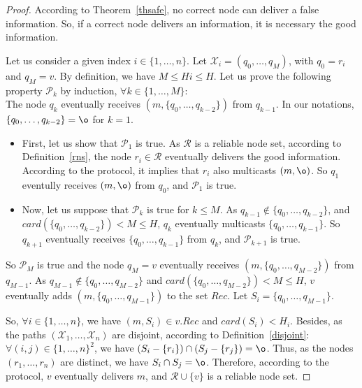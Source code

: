 \documentclass[a4paper,11pt]{article}
\begin{document}
\begin{proof}
According to Theorem~\ref{thsafe}, no correct node can deliver a false information. So, if a correct node delivers an information, it is necessary the good information.

Let us consider a given index $i \in \{1,\dots,n\}$.
Let $\mathcal{X}_i = (q_0,\dots,q_M)$, with $q_0 = r_i$ and $q_M = v$. By definition, we have $M \leq Hi \leq H$.
Let us prove the following property $\mathcal{P}_k$ by induction, $\forall k \in \{1,\dots,M\}$:
\\The node $q_k$ eventually receives $(m,\{q_0,\dots,q_{k-2}\})$ from $q_{k-1}$. In our notations, $\{q_0,\dots,q_{k-2}\} = \o$ for $k=1$.

\begin{itemize}

\item First, let us show that $\mathcal{P}_1$ is true.
As $\mathcal{R}$ is a reliable node set, according to Definition~\ref{rns}, the node $r_i \in \mathcal{R}$ eventually delivers the good information.
According to the protocol, it implies that $r_i$ also multicasts $(m,\o)$.
So $q_1$ eventully receives $(m,\o)$ from $q_0$, and $\mathcal{P}_1$ is true.

\item Now, let us suppose that $\mathcal{P}_k$ is true for $k \leq M$.
As $q_{k-1} \notin \{q_0,\dots,q_{k-2}\}$, and $card(\{q_0,\dots,q_{k-2}\}) < M \leq H$, $q_k$ eventually multicasts $\{q_0,\dots,q_{k-1}\}$.
So $q_{k+1}$ eventually receives $\{q_0,\dots,q_{k-1}\}$ from $q_k$, and $\mathcal{P}_{k+1}$ is true.

\end{itemize}

So $\mathcal{P}_M$ is true and the node $q_M = v$ eventually receives $(m,\{q_0,\dots,q_{M-2}\})$ from $q_{M-1}$.
As $q_{M-1} \notin \{q_0,\dots,q_{M-2}\}$ and $card(\{q_0,\dots,q_{M-2}\}) < M \leq H$, $v$ eventually adds $(m,\{q_0,\dots,q_{M-1}\})$ to the set $Rec$.
Let $S_i = \{q_0,\dots,q_{M-1}\}$.

So, $\forall i \in \{1,\dots,n\}$, we have $(m,S_i) \in v.Rec$ and $card(S_i) < H_i$.
Besides, as the paths $(\mathcal{X}_1,\dots,\mathcal{X}_n)$ are disjoint, according to Definition~\ref{disjoint}: $\forall (i,j) \in \{1,\dots,n\}^2$, we have $(S_i - \{r_i\}) \cap (S_j - \{r_j\}) = \o$.
Thus, as the nodes $(r_1,\dots,r_n)$ are distinct, we have $S_i \cap S_j = \o$.
Therefore, according to the protocol, $v$ eventually delivers $m$, and $\mathcal{R} \cup \{v\}$ is a reliable node set.

\end{proof}
\end{document}

